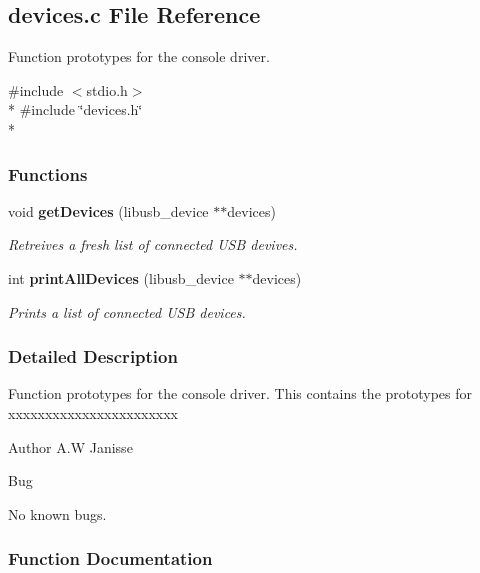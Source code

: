 \subsection{devices.\-c File Reference}
\label{devices_8c}


Function prototypes for the console driver.  


{\ttfamily \#include $<$stdio.\-h$>$}\\*
{\ttfamily \#include \char`\"{}devices.\-h\char`\"{}}\\*
\subsubsection*{Functions}
\begin{DoxyCompactItemize}
\item 
void {\bf get\-Devices} (libusb\-\_\-device $\ast$$\ast$devices)
\begin{DoxyCompactList}\small\item\em Retreives a fresh list of connected U\-S\-B devives. \end{DoxyCompactList}\item 
int {\bf print\-All\-Devices} (libusb\-\_\-device $\ast$$\ast$devices)
\begin{DoxyCompactList}\small\item\em Prints a list of connected U\-S\-B devices. \end{DoxyCompactList}\end{DoxyCompactItemize}


\subsubsection{Detailed Description}
Function prototypes for the console driver. This contains the prototypes for xxxxxxxxxxxxxxxxxxxxxxx

\begin{DoxyAuthor}{Author}
A.\-W Janisse 
\end{DoxyAuthor}
\begin{DoxyRefDesc}{Bug}
\item[{\bf Bug}]No known bugs. \end{DoxyRefDesc}


\subsubsection{Function Documentation}
